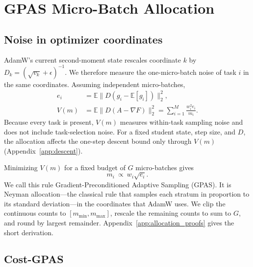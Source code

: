 \section{GPAS Micro-Batch Allocation}
\label{sec:theory}

\subsection{Noise in optimizer coordinates}

AdamW's current second-moment state rescales coordinate $k$ by
$D_k=(\sqrt{v_k}+\epsilon)^{-1}$. We therefore measure the
one-micro-batch noise of task $i$ in the same coordinates. Assuming independent
micro-batches,
\begin{equation}
\begin{split}
    e_i&=\mathbb E\bigl\|D(g_i-\mathbb E[g_i])\bigr\|_2^2,\\
    V(m)&=\mathbb E\bigl\|D(A-\nabla F)\bigr\|_2^2
          =\sum_{i=1}^M\frac{w_i^2e_i}{m_i}.
\end{split}
\label{eq:batch_variance}
\end{equation}
Because every task is present, $V(m)$ measures within-task sampling noise and
does not include task-selection noise. For a fixed student state, step size,
and $D$, the allocation affects the one-step descent bound only through $V(m)$
(Appendix~\ref{app:descent}).

Minimizing $V(m)$ for a fixed budget of $G$ micro-batches gives
\begin{equation}
    m_i\ \propto\ w_i\sqrt{e_i}.
    \label{eq:batch_gpas_allocation}
\end{equation}
We call this rule Gradient-Preconditioned Adaptive Sampling (GPAS). It is
Neyman allocation---the classical rule that samples each stratum in proportion
to its standard deviation---in the coordinates that AdamW uses. We clip the
continuous counts to $[m_{\min},m_{\max}]$, rescale the remaining counts to sum
to $G$, and round by largest remainder. Appendix~\ref{app:allocation_proofs}
gives the short derivation.

\subsection{Cost-GPAS}

